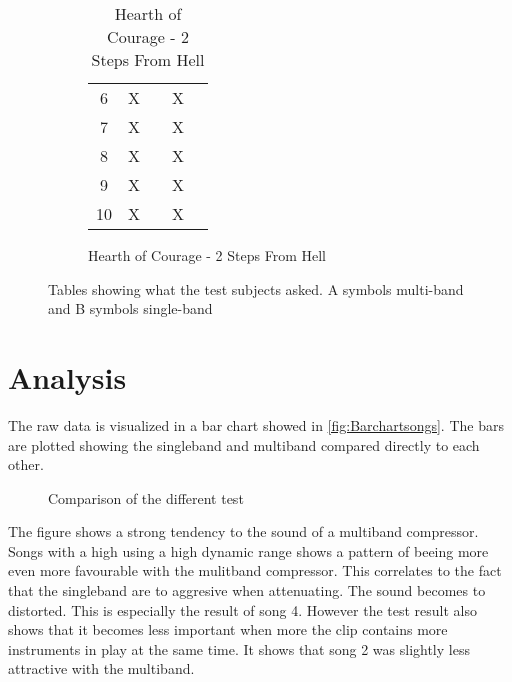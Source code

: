 \begin{figure}[H]
\begin{subfigure}[t]{0.45\textwidth}
\begin{table}[H]
\begin{tabular}{ccccc}
6          & X         &           & X         &          \\
7          & X         &           & X         &          \\
8          & X         &           & X         &          \\
9          & X         &           & X         &          \\
10         & X         &           & X         &          \\ \bottomrule
\end{tabular}
\caption{Hearth of Courage - 2 Steps From Hell}
\label{tab:HearthofCourage}
\end{table}
\end{subfigure}

\caption{Tables showing what the test subjects asked. A symbols multi-band and B symbols single-band}
\label{tab:combinedanswers}
\end{figure}  


\section{Analysis}

The raw data is visualized in a bar chart showed in \autoref{fig:Barchartsongs}. The bars are plotted showing the singleband and multiband compared directly to each other.
\begin{figure}
\centering
{}
\caption{Comparison of the different test}
\label{fig:Barchartsongs}
\end{figure}

The figure shows a strong tendency to the sound of a multiband compressor. Songs with a high using a high dynamic range shows a pattern of beeing more even more favourable with the mulitband compressor. This correlates to the fact that the singleband are to aggresive when attenuating. The sound becomes to distorted. This is especially the result of song 4. However the test result also shows that it becomes less important when more the clip contains more instruments in play at the same time. It shows that song 2 was slightly less attractive with the multiband. 

